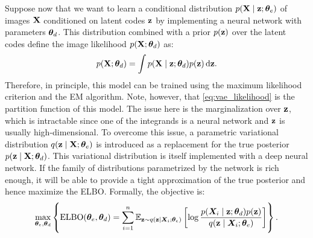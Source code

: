 Suppose now that we want to learn a conditional distribution $p({\mathbf{X}} \mid {\mathbf{z}}; {\bm{\theta}}_e)$ of images ${\mathbf{X}}$ conditioned on latent codes ${\mathbf{z}}$ by implementing a neural network with parameters ${\bm{\theta}}_d$. This distribution combined with a prior $p({\mathbf{z}})$ over the latent codes define the image likelihood $p({\mathbf{X}}; {\bm{\theta}}_d)$ as:
\begin{equation}
    \label{eq:vae_likelihood}
    p({\mathbf{X}}; {\bm{\theta}}_d) = \int p({\mathbf{X}} \mid {\mathbf{z}}; {\bm{\theta}}_d) p({\mathbf{z}}) {\,\text{d}} {\mathbf{z}}.
\end{equation}
Therefore, in principle, this model can be trained using the maximum likelihood criterion and the EM algorithm. Note, however, that \eqref{eq:vae_likelihood} is the partition function of this model. The issue here is the marginalization over ${\mathbf{z}}$, which is intractable since one of the integrands is a neural network and ${\mathbf{z}}$ is usually high-dimensional. To overcome this issue, a parametric variational distribution $q({\mathbf{z}} \mid {\mathbf{X}}; {\bm{\theta}}_e)$ is introduced as a replacement for the true posterior $p({\mathbf{z}} \mid {\mathbf{X}}; {\bm{\theta}}_d)$. This variational distribution is itself implemented with a deep neural network. If the family of distributions parametrized by the network is rich enough, it will be able to provide a tight approximation of the true posterior and hence maximize the ELBO. Formally, the objective is:
\begin{equation}
    \max_{{\bm{\theta}}_e, {\bm{\theta}}_d} \left\lbrace \mathrm{ELBO}({\bm{\theta}}_e, {\bm{\theta}}_d) = \sum_{i=1}^n \mathbb{E}_{{\mathbf{z}} \sim q({\mathbf{z}} \mid {\bm{X}}_i; {\bm{\theta}}_e)} \left[ \log \frac{p({\bm{X}}_i \mid {\mathbf{z}}; {\bm{\theta}}_d)p({\mathbf{z}})}{q({\mathbf{z}} \mid {\bm{X}}_i; {\bm{\theta}}_e)} \right] \right\rbrace.
\end{equation}

